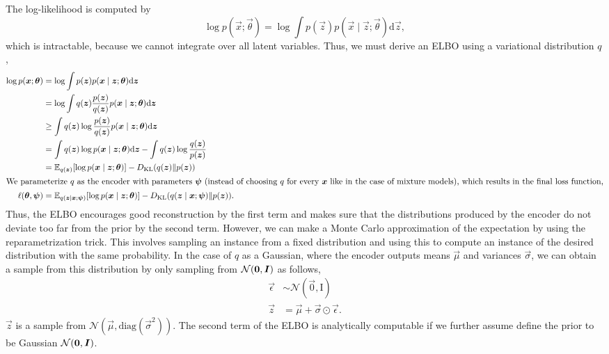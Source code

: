 The log-likelihood is computed by \[
    \log p(\vec{x}; \vec{\theta}) = \log \int p(\vec{z}) p(\vec{x} \mid \vec{z}; \vec{\theta}) \mathrm{d}\vec{z},
\]
which is intractable, because we cannot integrate over all latent variables. Thus, we must derive
an ELBO using a variational distribution $q$,
\begin{align*}
    \log p(\bm{x}; \bm{\theta})  & = \log \int p(\bm{z}) p(\bm{x} \mid \bm{z}; \bm{\theta}) \mathrm{d}\bm{z}                                                                               \\
                                   & = \log \int q(\bm{z}) \frac{p(\bm{z})}{q(\bm{z})} p(\bm{x} \mid \bm{z}; \bm{\theta}) \mathrm{d}\bm{z}                                                 \\
                                   & \geq \int q(\bm{z}) \log \frac{p(\bm{z})}{q(\bm{z})} p(\bm{x} \mid \bm{z}; \bm{\theta}) \mathrm{d}\bm{z}                                              \\
                                   & = \int q(\bm{z}) \log p(\bm{x} \mid \bm{z}; \bm{\theta}) \mathrm{d}\bm{z} - \int q(\bm{z}) \log \frac{q(\bm{z})}{p(\bm{z})}                          \\
                                   & = \mathbb{E}_{q(\bm{z})}[\log p(\bm{x} \mid \bm{z}; \bm{\theta})] - D_{\mathrm{KL}}(q(\bm{z}) \| p(\bm{z}))                                                    \\
    \intertext{We parameterize $q$ as the encoder with parameters $\bm{\psi}$ (instead of choosing $q$ for every $\bm{x}$ like in the case of mixture models), which results in the final loss function,}
    \ell(\bm{\theta}, \bm{\psi}) & = \mathbb{E}_{q(\bm{z} \mid \bm{x}; \bm{\psi})}[\log p(\bm{x} \mid \bm{z}; \bm{\theta})] - D_{\mathrm{KL}}(q(\bm{z} \mid \bm{x}; \bm{\psi}) \| p(\bm{z})).
\end{align*}
Thus, the ELBO encourages good reconstruction by the first term and makes sure that the distributions
produced by the encoder do not deviate too far from the prior by the second term. However, we can
make a Monte Carlo approximation of the expectation by using the reparametrization trick. This
involves sampling an instance from a fixed distribution and using this to compute an instance of the desired
distribution with the same probability. In the case of $q$ as a Gaussian, where the encoder outputs
means $\vec{\mu}$ and variances $\vec{\sigma}$, we can obtain a sample from this distribution by
only sampling from $\mathcal{N}(\bm{0}, \bm{I})$ as follows,
\begin{align*}
    \vec{\epsilon} & \sim \mathcal{N}(\vec{0}, \mathrm{I})            \\
    \vec{z}        & = \vec{\mu} + \vec{\sigma} \odot \vec{\epsilon}.
\end{align*}
$\vec{z}$ is a sample from $\mathcal{N}(\vec{\mu}, \mathrm{diag}(\vec{\sigma}^2))$. The second term
of the ELBO is analytically computable if we further assume define the prior to be Gaussian
$\mathcal{N}(\bm{0}, \bm{I})$.

